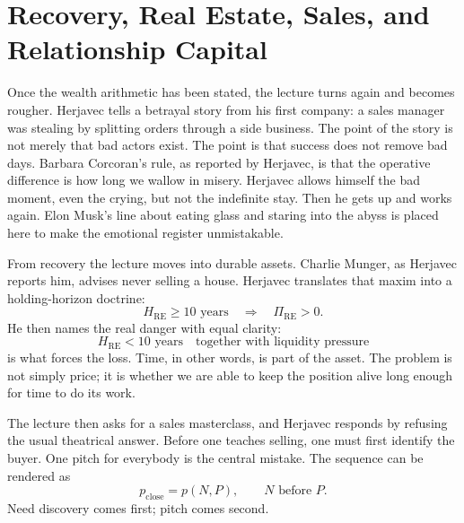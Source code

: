 \section{Recovery, Real Estate, Sales, and Relationship Capital}

Once the wealth arithmetic has been stated, the lecture turns again and becomes rougher. Herjavec tells a betrayal story from his first company: a sales manager was stealing by splitting orders through a side business. The point of the story is not merely that bad actors exist. The point is that success does not remove bad days. Barbara Corcoran's rule, as reported by Herjavec, is that the operative difference is how long we wallow in misery. Herjavec allows himself the bad moment, even the crying, but not the indefinite stay. Then he gets up and works again. Elon Musk's line about eating glass and staring into the abyss is placed here to make the emotional register unmistakable.

From recovery the lecture moves into durable assets. Charlie Munger, as Herjavec reports him, advises never selling a house. Herjavec translates that maxim into a holding-horizon doctrine:
\begin{equation}
H_{\mathrm{RE}} \ge 10 \text{ years}
\quad \Rightarrow \quad
\Pi_{\mathrm{RE}} > 0.
\end{equation}
He then names the real danger with equal clarity:
\begin{equation}
H_{\mathrm{RE}} < 10 \text{ years}
\quad \text{together with liquidity pressure}
\end{equation}
is what forces the loss. Time, in other words, is part of the asset. The problem is not simply price; it is whether we are able to keep the position alive long enough for time to do its work.

The lecture then asks for a sales masterclass, and Herjavec responds by refusing the usual theatrical answer. Before one teaches selling, one must first identify the buyer. One pitch for everybody is the central mistake. The sequence can be rendered as
\begin{equation}
p_{\mathrm{close}} = p(N,P),
\qquad
N \text{ before } P.
\end{equation}
Need discovery comes first; pitch comes second.

\begin{figure}
\centering
{}
\end{figure}

